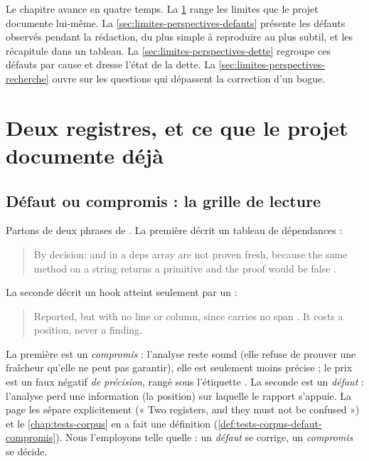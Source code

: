 Le chapitre avance en quatre temps. La \cref{sec:limites-perspectives-assumees} range les limites que le projet documente lui-même. La \cref{sec:limites-perspectives-defauts} présente les défauts observés pendant la rédaction, du plus simple à reproduire au plus subtil, et les récapitule dans un tableau. La \cref{sec:limites-perspectives-dette} regroupe ces défauts par cause et dresse l'état de la dette. La \cref{sec:limites-perspectives-recherche} ouvre sur les questions qui dépassent la correction d'un bogue.

\section{Deux registres, et ce que le projet documente déjà}
\label{sec:limites-perspectives-assumees}

\subsection{Défaut ou compromis : la grille de lecture}

Partons de deux phrases de . La première décrit un tableau de dépendances :

\begin{quote}\small
By decision:  and  in a deps array are not proven fresh, because the same method on a string returns a primitive and the proof would be false .
\end{quote}

La seconde décrit un hook atteint seulement par un  :

\begin{quote}\small
Reported, but with no line or column, since  carries no span . It costs a position, never a finding.
\end{quote}

La première est un \emph{compromis} : l'analyse reste sound (elle refuse de prouver une fraîcheur qu'elle ne peut pas garantir), elle est seulement moins précise ; le prix est un faux négatif \emph{de précision}, rangé sous l'étiquette . La seconde est un \emph{défaut} : l'analyse perd une information (la position) sur laquelle le rapport s'appuie. La page les sépare explicitement (« Two registers, and they must not be confused ») et le \cref{chap:tests-corpus} en a fait une définition (\cref{def:tests-corpus-defaut-compromis}). Nous l'employons telle quelle : un \emph{défaut} se corrige, un \emph{compromis} se décide.

